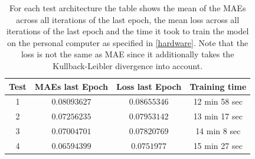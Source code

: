 \begin{center}
    \begin{table}[H]
        \centering
        \begin{tabular}{ | c | c | c | c | }
            \hline
            Test &MAEs last Epoch & Loss last Epoch & Training time\\ \hline
            1 & $0.08093627$  & $0.08655346$  & 12 min 58 sec  \\
            2 & $0.07256235$  & $0.07953142$  & 13 min 17 sec  \\
            3 & $0.07004701$  & $0.07820769$  & 14 min 8 sec  \\  
            4 & $0.06594399$  & $0.0751977$  & 15 min 27 sec  \\  
            \hline
        \end{tabular} 
        \caption{For each test architecture the table shows the mean of the MAEs across all iterations of the last
        epoch, the mean loss across all iterations of the last epoch and the time it took to train the model
        on the personal computer as specified in \autoref{hardware}. Note that the loss is not the same
        as MAE since it additionally takes the Kullback-Leibler divergence into account.}  \label{table_mae_1}
    \end{table}
\end{center}

